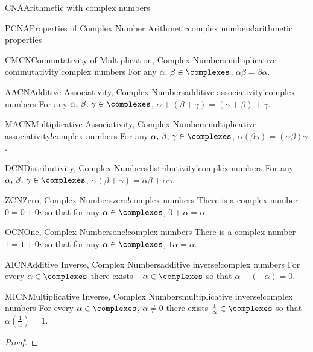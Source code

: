 \begin{subsect}{CNA}{Arithmetic with complex numbers}
\begin{theorem}{PCNA}{Properties of Complex Number Arithmetic}{complex numbers!arithmetic properties}
\begin{para}
\begin{propertylist}
\begin{property}{CMCN}{Commutativity of Multiplication, Complex Numbers}{multiplicative commutativity!complex numbers}
For any $\alpha,\,\beta\in\complexes$, $\alpha\beta=\beta\alpha$.\end{property}
%
\begin{property}{AACN}{Additive Associativity, Complex Numbers}{additive associativity!complex numbers}
For any $\alpha,\,\beta,\,\gamma\in\complexes$, $\alpha+\left(\beta+\gamma\right)=\left(\alpha+\beta\right)+\gamma$.\end{property}
%
\begin{property}{MACN}{Multiplicative Associativity, Complex Numbers}{multiplicative associativity!complex numbers}
For any $\alpha,\,\beta,\,\gamma\in\complexes$, $\alpha\left(\beta\gamma\right)=\left(\alpha\beta\right)\gamma$.\end{property}
%
\begin{property}{DCN}{Distributivity, Complex Numbers}{distributivity!complex numbers}
For any $\alpha,\,\beta,\,\gamma\in\complexes$, $\alpha(\beta+\gamma)=\alpha\beta+\alpha\gamma$.\end{property}
%
\begin{property}{ZCN}{Zero, Complex Numbers}{zero!complex numbers}
There is a complex number $0=0+0i$ so that for any $\alpha\in\complexes$, $0+\alpha=\alpha$.\end{property}
%
\begin{property}{OCN}{One, Complex Numbers}{one!complex numbers}
There is a complex number $1=1+0i$ so that for any $\alpha\in\complexes$, $1\alpha=\alpha$.\end{property}
%
\begin{property}{AICN}{Additive Inverse, Complex Numbers}{additive inverse!complex numbers}
For every $\alpha\in\complexes$ there exists $-\alpha\in\complexes$ so that $\alpha+\left(-\alpha\right)=0$.\end{property}
%
\begin{property}{MICN}{Multiplicative Inverse, Complex Numbers}{multiplicative inverse!complex numbers}
For every $\alpha\in\complexes$, $\alpha\neq 0$ there exists $\frac{1}{\alpha}\in\complexes$ so that $\alpha\left(\frac{1}{\alpha}\right)=1$.\end{property}
%
\end{propertylist}
\end{para}
\end{theorem}
%
\begin{proof}

\end{proof}
\end{subsect}
